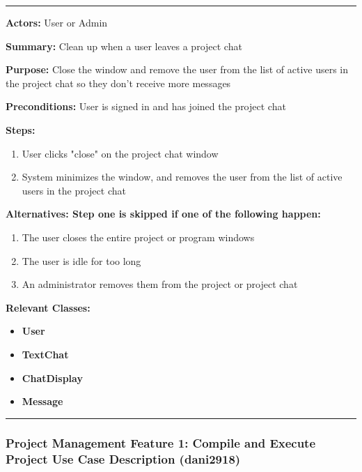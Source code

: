 \documentclass[twoside,letterpaper]{article}
\begin{document}
	\vspace{2pt}
	\hrule
	\vspace{8pt}
	\textbf{Actors:} User or Admin \newline
	
	\noindent\textbf{Summary:} Clean up when a user leaves a project chat \newline
	
	\noindent\textbf{Purpose:} Close the window and remove the user from the list of active users in the project chat so they don't receive more messages \newline
	
	\noindent\textbf{Preconditions:} User is signed in and has joined the project chat \newline
	
	\noindent\textbf{Steps:} \begin{enumerate}
		\item User clicks "close" on the project chat window
		\item System minimizes the window, and removes the user from the list of active users in the project chat
	\end{enumerate}
	\noindent\textbf{Alternatives: Step one is skipped if one of the following happen: }
	\begin{enumerate}
		\item The user closes the entire project or program windows
		\item The user is idle for too long
		\item An administrator removes them from the project or project chat
	\end{enumerate}
	
	
	\noindent\textbf{Relevant Classes:}
	\begin{itemize}
		\item \textbf{User}
		\item \textbf{TextChat}
		\item \textbf{ChatDisplay}
		\item \textbf{Message}
	\end{itemize}
	\hrule
	\newpage
	
	\subsubsection[Project Management Feature 1: Use Case Description 1: Compile and execute project (dani2918)]{\rmfamily\bfseries\color{black}
		Project Management Feature 1: Compile and Execute Project Use Case Description (dani2918) }
	\hypertarget{RefHeading22059017292}{}
	\label{pm:uc1}
	
\end{document}
